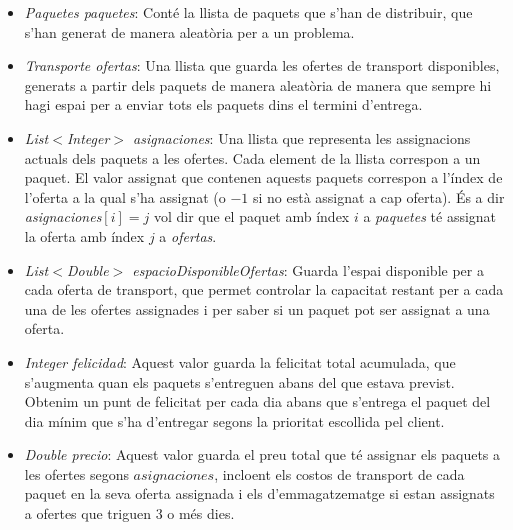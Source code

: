 \documentclass[a4paper]{article}
\begin{document}
	\begin{itemize}
		\item \emph{Paquetes paquetes}: Conté la llista de paquets que s'han de distribuir, que s'han generat de manera aleatòria per a un problema.
		\item \emph{Transporte ofertas}: Una llista que guarda les ofertes de transport disponibles, generats a partir dels paquets de manera aleatòria de manera que sempre hi hagi espai per a enviar tots els paquets dins el termini d'entrega.
		\item \emph{List$<$Integer$>$ asignaciones}: Una llista que representa les assignacions actuals dels paquets a les ofertes. Cada element de la llista correspon a un paquet. El valor assignat que contenen aquests paquets correspon a l'índex de l'oferta a la qual s'ha assignat (o $-1$ si no està assignat a cap oferta). És a dir \emph{asignaciones$[i] = j$} vol dir que el paquet amb índex $i$ a \textit{paquetes} té assignat la oferta amb índex $j$ a \textit{ofertas}.
		\item \emph{List$<$Double$>$ espacioDisponibleOfertas}: Guarda l'espai disponible per a cada oferta de transport, que permet controlar la capacitat restant per a cada una de les ofertes assignades i per saber si un paquet pot ser assignat a una oferta.
		\item \emph{Integer felicidad}: Aquest valor guarda la felicitat total acumulada, que s'augmenta quan els paquets s'entreguen abans del que estava previst. Obtenim un punt de felicitat per cada dia abans que s'entrega el paquet del dia mínim que s'ha d'entregar segons la prioritat escollida pel client.
		\item \emph{Double precio}: Aquest valor guarda el preu total que té assignar els paquets a les ofertes segons $asignaciones$, incloent els costos de transport de cada paquet en la seva oferta assignada i els d'emmagatzematge si estan assignats a ofertes que triguen $3$ o més dies.
	\end{itemize}
		
\end{document}
